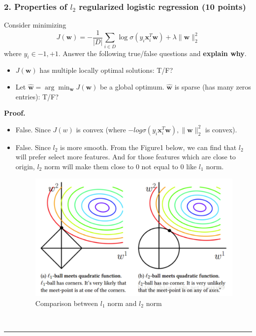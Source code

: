 \documentclass[12pt]{article}%
\newenvironment{proof}[1][Proof]{\textbf{#1.} }{\ \rule{0.5em}{0.5em}}
\begin{document}
\newpage

\newpage


\subsubsection*{2. Properties of $l_2$ regularized logistic regression (10 points)}
Consider minimizing
\[
J(\mathbf{w}) = -\frac{1}{|D|}\sum_{i\in D} \log \sigma(y_i\mathbf{x}_i^T\mathbf{w})+\lambda\|\mathbf{w}\|_2^2
\]
where $y_i\in {-1,+1}$. Answer the following true/false questions and \textbf{explain why}.
\begin{itemize}
\item $J(\mathbf{w})$ has multiple locally optimal solutions: T/F?
\item Let $\hat{\mathbf{w}}=\arg\min_{\mathbf{w}}J(\mathbf{w})$ be a global optimum. $\hat{\mathbf{w}}$ is sparse (has many zeros entries): T/F?
\end{itemize}

\begin{proof}
	\begin{itemize}
		\item False. Since $J(w)$ is convex (where $-log \sigma(y_i\mathbf{x}_i^T\mathbf{w}),  \|\mathbf{w}\|_2^2$ is convex).\\
		\item False. Since $l_2$ is more smooth. From the Figure1 below, we can find that $l_2$ will prefer select more features. And for those features which are close to origin, $l_2$ norm will make them close to 0 not equal to 0 like $l_1$ norm.
		
			\begin{figure}[htbp]
				\centering
				\includegraphics[width=.6\textwidth]{1.png} %
				\caption{Comparison between $l_1$ norm and $l_2$ norm} %
				\label{img} %
			\end{figure}
		
	\end{itemize}
\end{proof}
\end{document}
